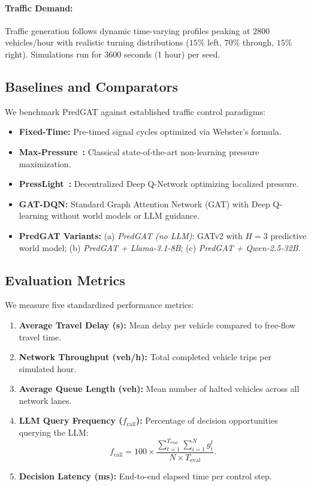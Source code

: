 \documentclass[11pt,a4paper]{article}
\begin{document}
\paragraph{Traffic Demand:} Traffic generation follows dynamic time-varying profiles peaking at $2800$\,vehicles/hour with realistic turning distributions ($15\%$ left, $70\%$ through, $15\%$ right). Simulations run for 3600 seconds (1 hour) per seed.

\subsection{Baselines and Comparators}
We benchmark PredGAT against established traffic control paradigms:
\begin{itemize}
    \item \textbf{Fixed-Time:} Pre-timed signal cycles optimized via Webster's formula.
    \item \textbf{Max-Pressure~\cite{varaiya2013max}:} Classical state-of-the-art non-learning pressure maximization.
    \item \textbf{PressLight~\cite{wei2019presslight}:} Decentralized Deep Q-Network optimizing localized pressure.
    \item \textbf{GAT-DQN:} Standard Graph Attention Network (GAT) with Deep Q-learning without world models or LLM guidance.
    \item \textbf{PredGAT Variants:} (a) \textit{PredGAT (no LLM)}: GATv2 with $H=3$ predictive world model; (b) \textit{PredGAT + Llama-3.1-8B}; (c) \textit{PredGAT + Qwen-2.5-32B}.
\end{itemize}

\subsection{Evaluation Metrics}
We measure five standardized performance metrics:
\begin{enumerate}
    \item \textbf{Average Travel Delay (s):} Mean delay per vehicle compared to free-flow travel time.
    \item \textbf{Network Throughput (veh/h):} Total completed vehicle trips per simulated hour.
    \item \textbf{Average Queue Length (veh):} Mean number of halted vehicles across all network lanes.
    \item \textbf{LLM Query Frequency ($f_{\text{call}}$):} Percentage of decision opportunities querying the LLM:
    \begin{equation}
        f_{\text{call}} = 100 \times \frac{\sum_{t=1}^{T_{\text{eval}}} \sum_{i=1}^{N} g_i^t}{N \times T_{\text{eval}}}.
    \end{equation}
    \item \textbf{Decision Latency (ms):} End-to-end elapsed time per control step.
\end{enumerate}
\end{document}
